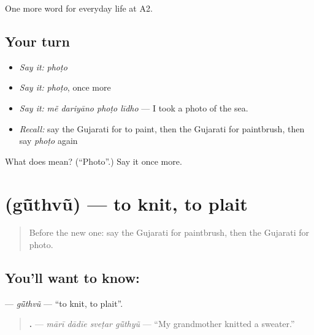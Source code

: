 \begin{grammarlens}[title={What you've built}]
One more word for everyday life at A2.
\end{grammarlens}

\subsection*{Your turn}
\begin{itemize}
\raggedright
  \item \emph{Say it:} \emph{phoṭo}
  \item \emph{Say it:} \emph{phoṭo}, once more
  \item \emph{Say it:} \emph{mẽ dariyāno phoṭo līdho} — I took a photo of the sea.
  \item \emph{Recall:} say the Gujarati for to paint, then the Gujarati for paintbrush, then say \emph{phoṭo} again
\end{itemize}

\begin{tcolorbox}[breakable,colback=teal!4,colframe=teal!35!black,title={Before you move on}]
What does  mean? (\textquotedblleft{}Photo\textquotedblright{}.) Say it once more.
\end{tcolorbox}
\section[\texorpdfstring{\gu{ગૂંથવું} (gū̃thvũ)}{ગૂંથવું (gū̃thvũ)}]{ (gū̃thvũ) — to knit, to plait}

\label{lesson:GU-C256-guthvu}



\begin{quote}
Before the new one: say the Gujarati for paintbrush, then the Gujarati for photo.
\end{quote}

\subsection*{You'll want to know: }
\textbf{} — \emph{gū̃thvũ} — \textquotedblleft{}to knit, to plait\textquotedblright{}.

\begin{quote}
\textbf{   .} — \emph{mārī dādīe sveṭar gū̃thyũ} — \textquotedblleft{}My grandmother knitted a sweater.\textquotedblright{}
\end{quote}


